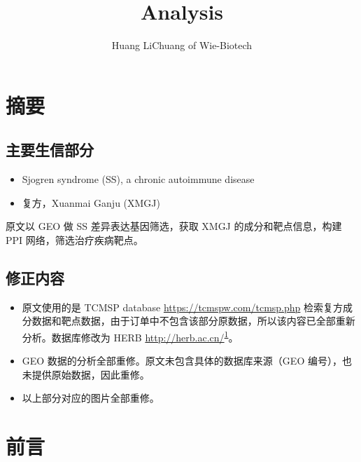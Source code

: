 \documentclass[
]{article}
\title{Analysis}
\author{Huang LiChuang of Wie-Biotech}
\date{}
\providecommand{\tightlist}{%
  \setlength{\itemsep}{0pt}\setlength{\parskip}{0pt}}
\begin{document}
\maketitle

{
\setcounter{tocdepth}{3}
\tableofcontents
}
\listoffigures

\listoftables

\hypertarget{abstract}{%
\section{摘要}\label{abstract}}

\hypertarget{ux4e3bux8981ux751fux4fe1ux90e8ux5206}{%
\subsection{主要生信部分}\label{ux4e3bux8981ux751fux4fe1ux90e8ux5206}}

\begin{itemize}
\tightlist
\item
  Sjogren syndrome (SS), a chronic autoimmune disease
\item
  复方，Xuanmai Ganju (XMGJ)
\end{itemize}

原文以 GEO 做 SS 差异表达基因筛选，获取 XMGJ 的成分和靶点信息，构建 PPI 网络，筛选治疗疾病靶点。

\hypertarget{ux4feeux6b63ux5185ux5bb9}{%
\subsection{修正内容}\label{ux4feeux6b63ux5185ux5bb9}}

\begin{itemize}
\item
  原文使用的是 TCMSP database \url{https://tcmspw.com/tcmsp.php} 检索复方成分数据和靶点数据，由于订单中不包含该部分原数据，所以该内容已全部重新分析。数据库修改为 HERB \url{http://herb.ac.cn/}\textsuperscript{\protect\hyperlink{ref-HerbAHighThFang2021}{1}}。
\item
  GEO 数据的分析全部重修。原文未包含具体的数据库来源（GEO 编号），也未提供原始数据，因此重修。
\item
  以上部分对应的图片全部重修。
\end{itemize}

\hypertarget{introduction}{%
\section{前言}\label{introduction}}
\end{document}
